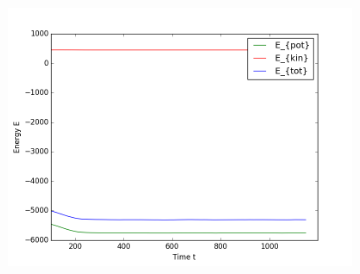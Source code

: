\begin{figure}[ht]
\begin{subfigure}{0.3\textwidth}
\includegraphics[width=\textwidth]{fig/avEnergies_T0d3_F20d0_M100.png}
\end{subfigure}
\end{figure}

